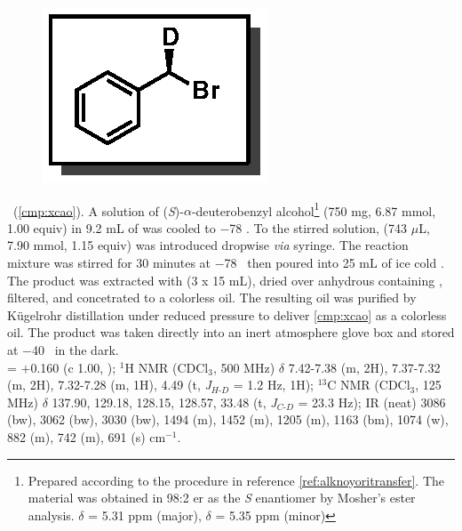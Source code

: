 \vspace{10pt}
\begin{figure}
  \vspace{-25pt}
  \begin{center}
    \includegraphics[scale=0.8]{chp_alkylation/images/xcao}
  \end{center}
  \vspace{-30pt}
\end{figure}
\noindent \textbf{\CMPxcao}\ (\ref{cmp:xcao}). A solution of (\textit{S})-$\alpha$-deuterobenzyl
alcohol\footnote{Prepared according to the procedure in reference \ref{ref:alknoyoritransfer}. The
material was obtained in 98:2 er as the \textit{S} enantiomer by Mosher's ester analysis. $\delta$ =
5.31 ppm (major), $\delta$ =
5.35 ppm (minor)} (750 mg, 6.87 mmol, 1.00 equiv) in 9.2 mL of  was cooled to $-$78
\degc.
To the stirred solution,  (743 $\mu$L, 7.90 mmol, 1.15 equiv) was introduced dropwise \textit{via} syringe. The reaction mixture was stirred for 30 minutes at $-$78
\degc\ then poured into 25 mL of ice cold . The product was extracted with
 (3 x 15 mL), dried over anhydrous  containing , filtered, and
concetrated to a colorless oil. The resulting oil was purified by K\"ugelrohr distillation under
reduced pressure to deliver \ref{cmp:xcao} as a colorless oil. The product was taken directly into
an inert atmosphere glove box and stored at $-$40 \degc\  in the dark.\\
\rotation = $+$0.160 (c 1.00,
); 
$^1$H NMR (CDCl$_3$, 500 MHz) $\delta$ 7.42-7.38 (m, 2H), 7.37-7.32 (m, 2H), 7.32-7.28 (m, 1H),
4.49 (t, \textit{J}$_{H\mbox{-}D}$ = 1.2 Hz, 1H); $^{13}$C NMR (CDCl$_3$, 125 MHz) $\delta$ 137.90,
129.18, 128.15, 128.57, 33.48 (t, \textit{J}$_{C\mbox{-}D}$ = 23.3 Hz); IR (neat)  3086
(bw), 3062 (bw), 3030 (bw), 1494 (m), 1452 (m), 1205 (m), 1163 (bm), 1074 (w), 882 (m),
742 (m), 691 (s) cm$^{-1}$.
\vspace{10pt}

